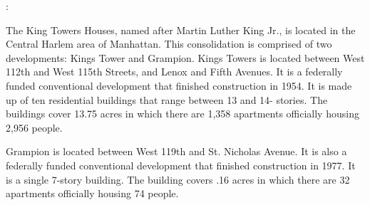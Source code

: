 : 

The King Towers Houses, named after Martin Luther King Jr., is located in the Central Harlem area of Manhattan. This consolidation is comprised of two developments: Kings Tower and Grampion. Kings Towers is located between West 112th and West 115th Streets, and Lenox and Fifth Avenues. It is a federally funded conventional development that finished construction in 1954. It is made up of ten residential buildings that range between 13 and 14- stories. The buildings cover 13.75 acres in which there are 1,358 apartments officially housing 2,956 people.  

 

Grampion is located between West 119th and St. Nicholas Avenue. It is also a federally funded conventional development that finished construction in 1977. It is a single 7-story building. The building covers .16 acres in which there are 32 apartments officially housing 74 people.  